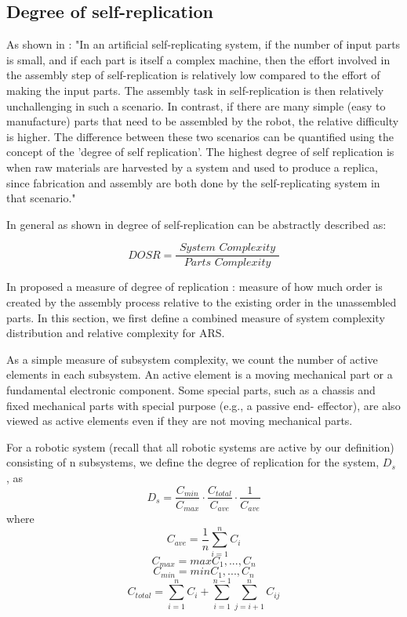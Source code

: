 \subsection{Degree of self-replication}
As shown in \cite{Chirikjian2022Entropy}:
"In an artificial self-replicating system, if the number of input parts is small,
and if each part is itself a complex machine, then the effort involved in the assembly 
step of self-replication is relatively low compared to the effort of making
the input parts. The assembly task in self-replication is then relatively unchallenging 
in such a scenario. In contrast, if there are many simple (easy to
manufacture) parts that need to be assembled by the robot, the relative difficulty 
is higher. The difference between these two scenarios can be quantified
using the concept of the 'degree of self replication'. The highest degree of self
replication is when raw materials are harvested by a system and used to produce
a replica, since fabrication and assembly are both done by the self-replicating
system in that scenario."

In general as shown in \cite{Chirikjian2022Entropy} degree of self-replication 
can be abstractly described as: 

\[\textit{DOSR} = \frac{\textit{ System\ Complexity }}{\textit{ Parts\ Complexity }}\]

In \citeyear{Lee2007Robotic} \citeauthor{Lee2007Robotic} proposed a measure of degree of replication \cite{Lee2007Robotic}:
measure of how much order is created by the assembly process relative to the existing order in
the unassembled parts. 
In this section, we first define a combined measure 
of system complexity distribution and relative complexity for ARS.

As a simple measure of subsystem complexity, we count the number of active elements in
each subsystem. An active element is a moving mechanical part or a fundamental electronic component.
Some special parts, such as a chassis and fixed mechanical parts with special purpose (e.g., a passive end-
effector), are also viewed as active elements even if they are not moving mechanical parts.


For a robotic system (recall that all robotic systems are active by our definition) 
consisting of n subsystems, we define the degree of replication for the system, $D_s$ , as
\begin{equation}
    \label{eq:3}
    D_s = \frac{C_{min}}{C_{max}} \cdot \frac{C_{total}}{C_{ave}} \cdot \frac{1}{C_{ave}} 
\end{equation}
where
\[ C_{ave} = \frac{1}{n} \sum_{i=1}^{n}{C_i} \] 
\[ C_{max} = max{C_1,...,C_n} \]
\[ C_{min} = min{C_1,...,C_n} \]
\[ C_{total} = \sum_{i=1}^{n}{C_i} + \sum_{i=1}^{n-1} \sum_{j=i+1}^{n}{C_{ij}} \]

